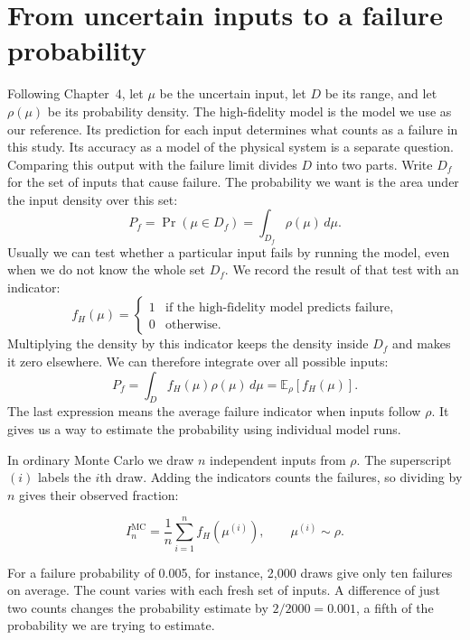 \documentclass[11pt,a4paper]{article}
\begin{document}
\section{From uncertain inputs to a failure probability}
Following Chapter~4, let $\mu$ be the uncertain input, let $D$ be its range, and let $\rho(\mu)$ be its probability density. The high-fidelity model is the model we use as our reference. Its prediction for each input determines what counts as a failure in this study. Its accuracy as a model of the physical system is a separate question. Comparing this output with the failure limit divides $D$ into two parts. Write $D_f$ for the set of inputs that cause failure. The probability we want is the area under the input density over this set:
\begin{equation}
P_f=\Pr(\mu\in D_f)=\int_{D_f}\rho(\mu)\,d\mu .
\end{equation}
Usually we can test whether a particular input fails by running the model, even when we do not know the whole set $D_f$. We record the result of that test with an indicator:
\[
f_H(\mu)=
\begin{cases}
1 & \text{if the high-fidelity model predicts failure},\\
0 & \text{otherwise}.
\end{cases}
\]
Multiplying the density by this indicator keeps the density inside $D_f$ and makes it zero elsewhere. We can therefore integrate over all possible inputs:
\begin{equation}
P_f=\int_D f_H(\mu)\rho(\mu)\,d\mu=\mathbb E_\rho[f_H(\mu)] .
\end{equation}
The last expression means the average failure indicator when inputs follow $\rho$. It gives us a way to estimate the probability using individual model runs.

In ordinary Monte Carlo we draw $n$ independent inputs from $\rho$. The superscript $(i)$ labels the $i$th draw. Adding the indicators counts the failures, so dividing by $n$ gives their observed fraction:


\begin{equation}
I_n^{\mathrm{MC}}=\frac{1}{n}\sum_{i=1}^n f_H(\mu^{(i)}),\qquad \mu^{(i)}\sim\rho .
\end{equation}

For a failure probability of 0.005, for instance, 2,000 draws give only ten failures on average. The count varies with each fresh set of inputs. A difference of just two counts changes the probability estimate by $2/2000=0.001$, a fifth of the probability we are trying to estimate.
\end{document}
